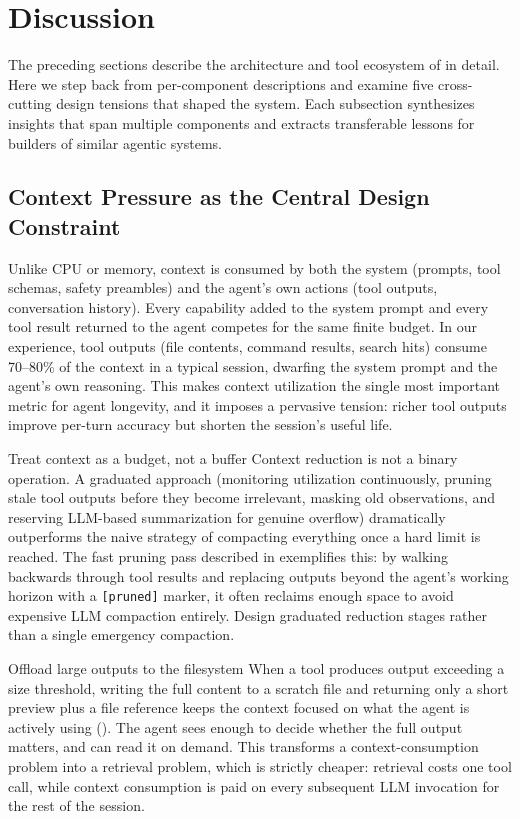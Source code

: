 \section{Discussion}
\label{sec:discussion}

The preceding sections describe the architecture and tool ecosystem of \name in detail. Here we step back from per-component descriptions and examine five cross-cutting design tensions that shaped the system. Each subsection synthesizes insights that span multiple components and extracts transferable lessons for builders of similar agentic systems.

\subsection{Context Pressure as the Central Design Constraint}

Unlike CPU or memory, context is consumed by both the system (prompts, tool schemas, safety preambles) and the agent's own actions (tool outputs, conversation history). Every capability added to the system prompt and every tool result returned to the agent competes for the same finite budget. In our experience, tool outputs (file contents, command results, search hits) consume 70--80\% of the context in a typical session, dwarfing the system prompt and the agent's own reasoning. This makes context utilization the single most important metric for agent longevity, and it imposes a pervasive tension: richer tool outputs improve per-turn accuracy but shorten the session's useful life.

\begin{lessonbox}{Treat context as a budget, not a buffer}
Context reduction is not a binary operation. A graduated approach (monitoring utilization continuously, pruning stale tool outputs before they become irrelevant, masking old observations, and reserving LLM-based summarization for genuine overflow) dramatically outperforms the naive strategy of compacting everything once a hard limit is reached. The fast pruning pass described in  exemplifies this: by walking backwards through tool results and replacing outputs beyond the agent's working horizon with a \texttt{[pruned]} marker, it often reclaims enough space to avoid expensive LLM compaction entirely. Design graduated reduction stages rather than a single emergency compaction.
\end{lessonbox}

\begin{lessonbox}{Offload large outputs to the filesystem}
When a tool produces output exceeding a size threshold, writing the full content to a scratch file and returning only a short preview plus a file reference keeps the context focused on what the agent is actively using (). The agent sees enough to decide whether the full output matters, and can read it on demand. This transforms a context-consumption problem into a retrieval problem, which is strictly cheaper: retrieval costs one tool call, while context consumption is paid on every subsequent LLM invocation for the rest of the session.
\end{lessonbox}

